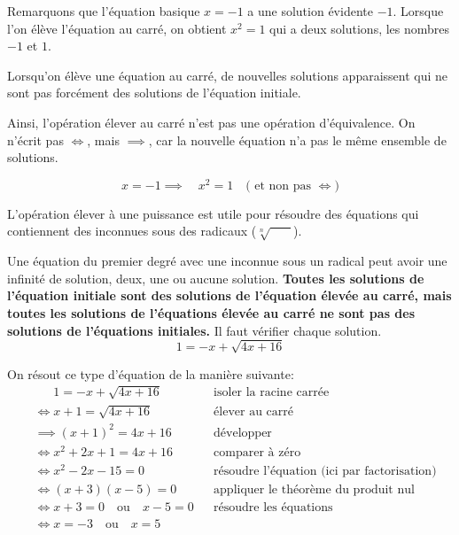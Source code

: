 \documentclass[a4paper,12pt]{report}
\begin{document}
Remarquons que l'équation basique $x=-1$ a une solution évidente $-1$. Lorsque l'on élève l'équation au carré, on obtient $x^2=1$ qui a deux solutions, les nombres $-1$ et $1$. 

\begin{boiteicone}
Lorsqu'on élève une équation au carré, de nouvelles solutions apparaissent qui ne sont pas forcément des solutions de l'équation initiale.	
\end{boiteicone}

Ainsi, l'opération \og{} élever au carré \fg{} n'est pas une opération d'équivalence. On n'écrit pas \og{}$\iff$\fg{}, mais \og{}$\implies$\fg{}, car la nouvelle équation n'a pas le même ensemble de solutions.

\[x=-1 \implies \quad x^2=1 \quad \text{( et non pas } \iff )\]

L'opération \og{} élever à une puissance \fg{} est utile pour résoudre des équations qui contiennent des inconnues sous des radicaux ($\sqrt[n]{\phantom{test}}$).

\medskip
\centering
{}

\raggedright
\medskip

Une équation du premier degré avec une inconnue sous un radical peut avoir une infinité de solution, deux, une ou aucune solution. {\bfseries Toutes les solutions de l'équation initiale sont des solutions de l'équation élevée au carré, mais toutes les solutions de l'équations élevée au carré ne sont pas des solutions de l'équations initiales.} Il faut vérifier chaque solution.
\[1=-x+\sqrt{4 x + 16 }\]

On résout ce type d'équation de la manière suivante:
\begin{align*}
&\phantom{\iff} 1=-x+\sqrt{4 x + 16 }&&\text{isoler la racine carrée}\\
&\iff x + 1=\sqrt{4 x + 16 }&&\text{élever au carré}\\&\implies \left(x + 1\right)^2=4 x + 16 &&\text{développer}\\&\iff x^2 + 2 x + 1=4 x + 16 && \text{comparer à zéro}\\&\iff x^2-2 x-15 =0&& \text{résoudre l'équation (ici par factorisation)}\\&\iff \left (x + 3 \right)\left (x-5 \right)=0&& \text{appliquer le théorème du produit nul}\\&\iff x + 3 =0 \quad\text{ou} \quad x-5 =0&& \text{résoudre les équations}\\&\iff x=-3\quad \text{ou} \quad x=5
\end{align*}
\end{document}
